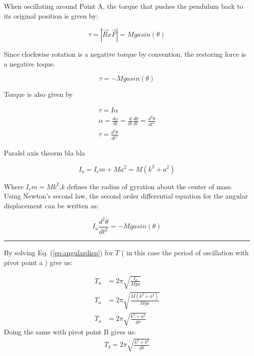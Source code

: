 \documentclass{report}
\begin{document}
When oscillating around Point A, the torque that pushes the pendulum back to its original position is given by:

\begin{equation}\tau=|\vec{ R } x \vec{ F }| = Mgasin\left(\theta\right)\end{equation}

Since clockwise rotation is a negative torque by convention, the restoring force is a negative toque.

\begin{equation}
    \tau=-Mgasin\left(\theta\right)
\end{equation}

Torque is also given by 

\begin{gather*}
    \tau=I\alpha \\
    \alpha=\frac{d\omega}{dt}=\frac{d}{dt}\frac{d\theta}{dt}=\frac{d^2\theta}{dt^2}\\
    \tau=\frac{d^2\theta}{dt^2}
\end{gather*}

Paralel axis theorm bla bla

\begin{equation}
    I_a=I_cm + Ma^2 = M(k^2+a^2)
\end{equation}

Where $I_cm = Mk^2$,$k$ defines the radius of gyration about the center of mass. Using Newton's second law, the second order differential equation for the angular displacement can be written as:

\begin{equation}
    I_a\frac{d^2\theta}{dt^2}=-Mgasin\left(\theta\right) \label{eq:angulardisp}
\end{equation}


\noindent\textcolor{red}{\rule{10cm}{1mm}}

By solving Eq. (\ref{eq:angulardisp}) for $T$ ( in this case the period of oscillation with pivot point a ) give us:

\begin{align}
    T_a&=2\pi \sqrt{\frac{I_a}{Mga}}\nonumber\\
    T_a&=2\pi \sqrt{\frac{M(k^2+a^2)}{ Mga }}\nonumber\\
    T_a&=2\pi \sqrt{\frac{k^2+a^2}{ga}} \label{eq:perioda}
\end{align}
Doing the same with pivot point B gives us:
\begin{gather}
    T_b=2\pi \sqrt{\frac{k^2+b^2}{gb}}\label{eq:periodb}
\end{gather}
\end{document}
